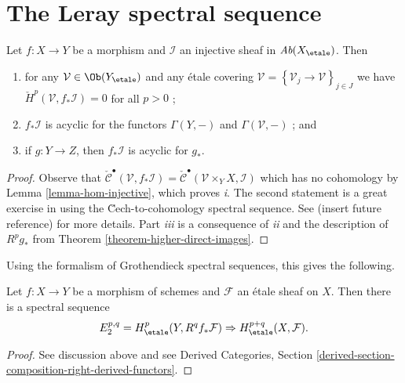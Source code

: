 \section{The Leray spectral sequence}
\label{section-leray}

\begin{lemma}
\label{lemma-prepare-leray}
Let $f: X\to Y$ be a morphism and $\mathcal{I}$ an injective sheaf in
$\textit{Ab}(X_\etale)$. Then
\begin{enumerate}
\item
for any $\mathcal{V}\in\Ob(Y_\etale)$ and any \'etale covering
$\mathcal{V}=\left\{\mathcal{V}_j\to \mathcal{V}\right\}_{j\in J}$ we have
$\check H^p(\mathcal{V}, f_*\mathcal{I}) = 0$ for all $p>0$ ;
\item
$f_*\mathcal{I}$ is acyclic for the functors $\Gamma(Y, -)$ and
$\Gamma(\mathcal{V}, -)$ ; and
\item
if $g: Y\to Z$, then $f_*\mathcal{I}$ is acyclic for $g_*$.
\end{enumerate}
\end{lemma}

\begin{proof}
Observe that $\check{\mathcal{C}}^\bullet(\mathcal{V}, f_*\mathcal{I}) =
\check{\mathcal{C}}^\bullet(\mathcal{V} \times_Y X, \mathcal{I})$ which has no
cohomology by Lemma \ref{lemma-hom-injective}, which proves {\it i}. The
second statement is a great exercise in using the \u Cech-to-cohomology
spectral sequence. See (insert future reference) for more details. Part {\it
iii} is a consequence of {\it ii} and the description of $R^pg_*$ from
Theorem \ref{theorem-higher-direct-images}.
\end{proof}

\noindent
Using the formalism of Grothendieck spectral sequences, this gives the
following.

\begin{proposition}
\label{proposition-leray}
Let $f: X \to Y$ be a morphism of schemes and $\mathcal{F}$ an \'etale sheaf on
$X$. Then there is a spectral sequence
$$
E_2^{p, q} = H_\etale^p(Y, R^qf_*\mathcal{F}) \Rightarrow
H_\etale^{p+q}(X, \mathcal{F}).
$$
\end{proposition}

\begin{proof}
See discussion above and see
Derived Categories, Section
\ref{derived-section-composition-right-derived-functors}.
\end{proof}









